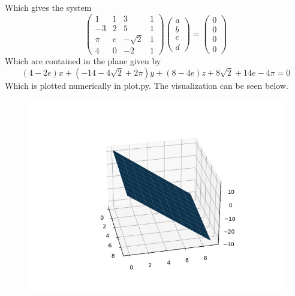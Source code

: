 \documentclass{article}
\begin{document}
Which gives the system 
\begin{equation*}
    \begin{pmatrix}
        1&1&3&1\\
        -3&2&5&1\\
        \pi&e&-\sqrt{2}&1\\
        4&0&-2&1
    \end{pmatrix}\begin{pmatrix}
        a\\b\\c\\d
    \end{pmatrix} = \begin{pmatrix}
        0\\0\\0\\0
    \end{pmatrix}
\end{equation*}
Which are contained in the plane given by  
\begin{equation*}
    (4-2e)x+(-14-4\sqrt{2}+2\pi)y + (8-4e)z+8\sqrt{2}+14e-4\pi = 0
\end{equation*} 
Which is plotted numerically in plot.py. The visualization can be seen below. 

\begin{figure}[H]
    \includegraphics[scale=0.5]{code/plane.png}
\end{figure}
\end{document}
